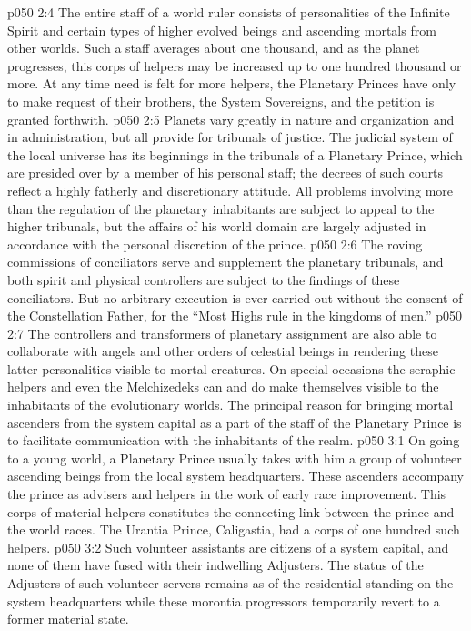 \vs p050 2:4 The entire staff of a world ruler consists of personalities of the Infinite Spirit and certain types of higher evolved beings and ascending mortals from other worlds. Such a staff averages about one thousand, and as the planet progresses, this corps of helpers may be increased up to one hundred thousand or more. At any time need is felt for more helpers, the Planetary Princes have only to make request of their brothers, the System Sovereigns, and the petition is granted forthwith.
\vs p050 2:5 Planets vary greatly in nature and organization and in administration, but all provide for tribunals of justice. The judicial system of the local universe has its beginnings in the tribunals of a Planetary Prince, which are presided over by a member of his personal staff; the decrees of such courts reflect a highly fatherly and discretionary attitude. All problems involving more than the regulation of the planetary inhabitants are subject to appeal to the higher tribunals, but the affairs of his world domain are largely adjusted in accordance with the personal discretion of the prince.
\vs p050 2:6 The roving commissions of conciliators serve and supplement the planetary tribunals, and both spirit and physical controllers are subject to the findings of these conciliators. But no arbitrary execution is ever carried out without the consent of the Constellation Father, for the “Most Highs rule in the kingdoms of men.”
\vs p050 2:7 The controllers and transformers of planetary assignment are also able to collaborate with angels and other orders of celestial beings in rendering these latter personalities visible to mortal creatures. On special occasions the seraphic helpers and even the Melchizedeks can and do make themselves visible to the inhabitants of the evolutionary worlds. The principal reason for bringing mortal ascenders from the system capital as a part of the staff of the Planetary Prince is to facilitate communication with the inhabitants of the realm.
\vs p050 3:1 On going to a young world, a Planetary Prince usually takes with him a group of volunteer ascending beings from the local system headquarters. These ascenders accompany the prince as advisers and helpers in the work of early race improvement. This corps of material helpers constitutes the connecting link between the prince and the world races. The Urantia Prince, Caligastia, had a corps of one hundred such helpers.
\pc \vs p050 3:2 Such volunteer assistants are citizens of a system capital, and none of them have fused with their indwelling Adjusters. The status of the Adjusters of such volunteer servers remains as of the residential standing on the system headquarters while these morontia progressors temporarily revert to a former material state.
